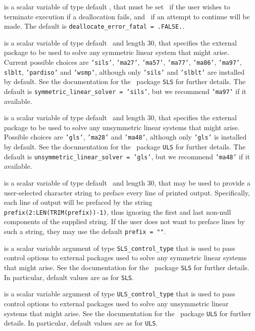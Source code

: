 \documentclass{galahad}
\begin{document}
\begin{description}
 is a scalar variable of type default \logical,
that must be set \true\ if the user wishes to terminate execution if
a deallocation  fails, and \false\ if an attempt to continue
will be made. The default is {\tt deallocate\_error\_fatal = .FALSE.}.

 is a scalar variable of type default \character\
and length 30, that specifies the external package to be used to
solve any symmetric linear system that might arise. Current possible
choices are {\tt 'sils'}, {\tt 'ma27'}, {\tt 'ma57'}, {\tt 'ma77'},
{\tt 'ma86'}, {\tt 'ma97'}, {\tt slblt}, {\tt 'pardiso'}
and {\tt 'wsmp'},
although only {\tt 'sils'} and {\tt 'slblt'} are installed by default.
See the documentation for the \galahad\ package {\tt SLS} for further details.
The default is {\tt symmetric\_linear\_solver = 'sils'},
but we recommend {\tt 'ma97'} if it available.

 is a scalar variable of type default
\character\
and length 30, that specifies the external package to be used to
solve any unsymmetric linear systems that might arise. Possible
choices are
{\tt 'gls'},
{\tt 'ma28'}
and
{\tt 'ma48'},
although only {\tt 'gls'} is installed by default.
See the documentation for the \galahad\ package {\tt ULS} for further details.
The default is {\tt unsymmetric\_linear\_solver = 'gls'},
but we recommend {\tt 'ma48'} if it available.

 is a scalar variable of type default \character\
and length 30, that may be used to provide a user-selected
character string to preface every line of printed output.
Specifically, each line of output will be prefaced by the string
{\tt prefix(2:LEN(TRIM(prefix))-1)},
thus ignoring the first and last non-null components of the
supplied string. If the user does not want to preface lines by such
a string, they may use the default {\tt prefix = ""}.

\itt{SLS\_control} is a scalar variable argument of type
{\tt SLS\_control\_type} that is used to pass control
options to external packages used to solve any symmetric
linear systems that might arise.
See the documentation for the \galahad\ package {\tt SLS} for further details.
In particular, default values are as for {\tt SLS}.

\itt{ULS\_control} is a scalar variable argument of type
{\tt ULS\_control\_type} that is used to pass control
options to external packages used to solve any unsymmetric
linear systems that might arise.
See the documentation for the \galahad\ package {\tt ULS} for further details.
In particular, default values are as for {\tt ULS}.

\end{description}
\end{document}
